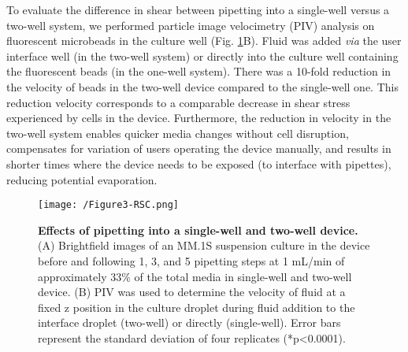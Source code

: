 To evaluate the difference in shear between pipetting into a single-well versus a two-well system, we performed particle image velocimetry (PIV) analysis on fluorescent microbeads in the culture well (Fig. \ref{figure:Fig3}B). Fluid was added \textit{via} the user interface well (in the two-well system) or directly into the culture well containing the fluorescent beads (in the one-well system). There was a 10-fold reduction in the velocity of beads in the two-well device compared to the single-well one. This reduction velocity corresponds to a comparable decrease in shear stress experienced by cells in the device. Furthermore, the reduction in velocity in the two-well system enables quicker media changes without cell disruption, compensates for variation of users operating the device manually, and results in shorter times where the device needs to be exposed (to interface with pipettes), reducing potential evaporation.

\begin{figure}[h!] %
\centering
\texttt{[image: /Figure3-RSC.png]}
\caption[\textbf{Effects of pipetting into a single-well and two-well device}]{\textbf{Effects of pipetting into a single-well and two-well device.} (A) Brightfield images of an MM.1S suspension culture in the device before and following 1, 3, and 5 pipetting steps at 1 mL/min of approximately 33\% of the total media in single-well and two-well device. (B) PIV was used to determine the velocity of fluid at a fixed z position in the culture droplet during fluid addition to the interface droplet (two-well) or directly (single-well). Error bars represent the standard deviation of four replicates (*p<0.0001).}
\label{figure:Fig3}
\end{figure}

